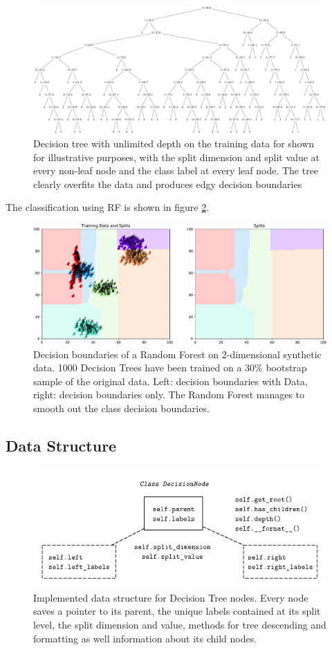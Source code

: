 \documentclass[10pt]{article}
\begin{document}
\begin{figure}[H]
    \centering
    \includegraphics[width=\textwidth]{decision_tree}
    \caption{Decision tree with unlimited depth on the training data for shown for illustrative purposes, with the split dimension and split value at every non-leaf node and the class label at every leaf node. The tree clearly overfits the data and produces edgy decision boundaries}
    \label{fig:decision_tree}
\end{figure}
The classification using \acrlong{RF} is shown in figure \ref{fig:rf}.

\begin{figure}[H]
    \centering
    \includegraphics[width=\textwidth]{rf}
    \caption{Decision boundaries of a Random Forest on 2-dimensional synthetic data. 1000 Decision Trees have been trained on a 30\% bootstrap sample of the original data. Left: decision boundaries with Data, right: decision boundaries only. The Random Forest manages to smooth  out the class decision boundaries.}
    \label{fig:rf}
\end{figure}

\subsection{Data Structure}
\begin{figure}[H]
    \centering
    \includegraphics[width=.7\textwidth]{Schema/decision-node}
    \caption{Implemented data structure for Decision Tree nodes. Every node saves a pointer to its parent, the unique labels contained at its split level, the split dimension and value, methods for tree descending and formatting as well information about its child nodes.}
    \label{fig:decision-node}
\end{figure}
\end{document}
